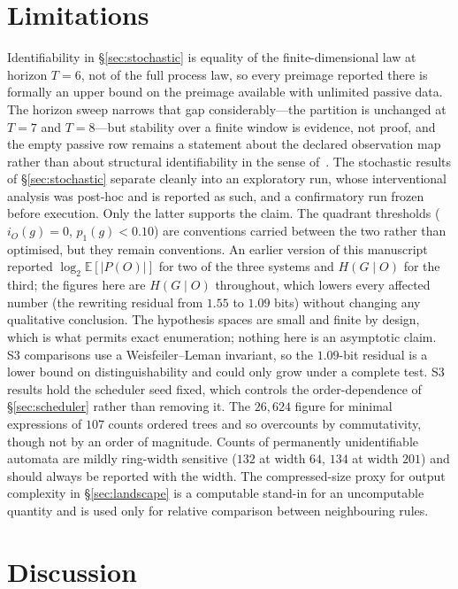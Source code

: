 \documentclass[11pt]{article}
\begin{document}
\section{Limitations}

Identifiability in \S\ref{sec:stochastic} is equality of the finite-dimensional law at
horizon $T=6$, not of the full process law, so every preimage reported there is formally an
upper bound on the preimage available with unlimited passive data. The horizon sweep
narrows that gap considerably---the partition is unchanged at $T=7$ and $T=8$---but
stability over a finite window is evidence, not proof, and the empty passive row remains a
statement about the declared observation map rather than about structural identifiability
in the sense of~\cite{ito1992}.
The stochastic results of \S\ref{sec:stochastic} separate cleanly into an exploratory
run, whose interventional analysis was post-hoc and is reported as such, and a
confirmatory run frozen before execution. Only the latter supports the claim. The
quadrant thresholds ($i_O(g)=0$, $p_1(g)<0.10$) are conventions carried between the two
rather than optimised, but they remain conventions.
An earlier version of this manuscript reported $\log_2\mathbb{E}[|P(O)|]$ for two of
the three systems and $H(G\mid O)$ for the third; the figures here are $H(G\mid O)$
throughout, which lowers every affected number (the rewriting residual from $1.55$ to
$1.09$ bits) without changing any qualitative conclusion.
The hypothesis spaces are small and finite by design, which is what permits exact
enumeration; nothing here is an asymptotic claim. S3 comparisons use a
Weisfeiler--Leman invariant, so the $1.09$-bit residual is a lower bound on
distinguishability and could only grow under a complete test. S3 results hold the
scheduler seed fixed, which controls the order-dependence of \S\ref{sec:scheduler}
rather than removing it. The $26{,}624$ figure for minimal expressions of $107$ counts
ordered trees and so overcounts by commutativity, though not by an order of magnitude.
Counts of permanently unidentifiable automata are mildly ring-width sensitive ($132$ at
width $64$, $134$ at width $201$) and should always be reported with the width. The
compressed-size proxy for output complexity in \S\ref{sec:landscape} is a computable
stand-in for an uncomputable quantity and is used only for relative comparison between
neighbouring rules.

\section{Discussion}
\end{document}
